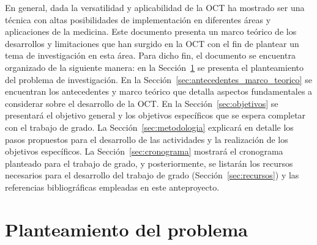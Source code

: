 
En general, dada la versatilidad y aplicabilidad de la OCT ha mostrado ser una técnica con altas posibilidades de implementación en diferentes áreas y aplicaciones de la medicina. Este documento presenta un marco teórico de los desarrollos y limitaciones que han surgido en la OCT con el fin de plantear un tema de investigación en esta área. Para dicho fin, el documento se encuentra organizado de la siguiente manera: en la Sección~\ref{sec:planteamiento_del_problema} se presenta el planteamiento del problema de investigación. En la Sección~\ref{sec:antecedentes_marco_teorico} se encuentran los antecedentes y marco teórico que detalla aspectos fundamentales a considerar sobre el desarrollo de la OCT. En la Sección~\ref{sec:objetivos} se presentará el objetivo general y los objetivos específicos que se espera completar con el trabajo de grado. La Sección~\ref{sec:metodologia} explicará en detalle los pasos propuestos para el desarrollo de las actividades y la realización de los objetivos específicos. La Sección~\ref{sec:cronograma} mostrará el cronograma planteado para el trabajo de grado, y posteriormente, se listarán los recursos necesarios para el desarrollo del trabajo de grado (Sección~\ref{sec:recursos}) y las referencias bibliográficas empleadas en este anteproyecto.

\section{Planteamiento del problema}
\label{sec:planteamiento_del_problema}




